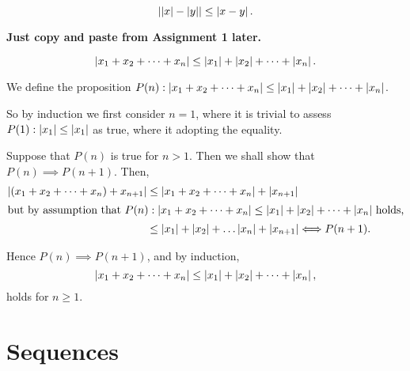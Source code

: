 \documentclass[12pt]{article}
\theoremstyle{definition}
\renewenvironment{proof}[1][\proofname]{\vspace{-10pt}\begin{replacementproof}}{\end{replacementproof}}
\begin{document}
    \begin{prop}
        \begin{equation*}
            \left|\left|x\right| - \left|y\right|\right| \leq \left|x - y\right|.
        \end{equation*}
    \end{prop}
    \begin{proof}
        \textbf{Just copy and paste from Assignment 1 later.}
    \end{proof} 

    \begin{corollary}
        \begin{equation*}
            \left|x_{1} + x_{2} + \dots + x_{n}\right| \leq \left|x_{1}\right| + \left|x_{2}\right| + \dots + \left|x_{n}\right|. 
        \end{equation*}
    \end{corollary}
    \begin{proof}
        We define the proposition $P(n): \left|x_{1} + x_{2} + \dots + x_{n}\right| \leq \left|x_{1}\right| + \left|x_{2}\right| + \dots + \left|x_{n}\right|$. 
        
        So by induction we first consider $n = 1$, where it is trivial to assess $P(1): \left|x_{1}\right| \leq \left|x_{1}\right|$ as true, where it adopting the equality. 

        Suppose that $P(n)$ is true for $n > 1$. Then we shall show that $P(n) \implies P(n + 1)$. 
        Then,
        \begin{align*}
            \left|(x_{1} + x_{2} + \dots + x_{n}) + x_{n + 1}\right| &\leq \left|x_{1} + x_{2} + \dots + x_{n}\right| + \left|x_{n + 1}\right| \\
            \intertext{but by assumption that $P(n): \left|x_{1} + x_{2} + \dots + x_{n}\right| \leq \left|x_{1}\right| + \left|x_{2}\right| + \dots + \left|x_{n}\right|$ holds,}
                                                              &\leq \left|x_{1}\right| + \left|x_{2}\right| + \dots \left|x_{n}\right| + \left|x_{n + 1}\right| \Longleftrightarrow P(n + 1).
        \end{align*}

        Hence $P(n) \implies P(n + 1)$, and by induction,
        \begin{equation*}
            \left|x_{1} + x_{2} + \dots + x_{n}\right| \leq \left|x_{1}\right| + \left|x_{2}\right| + \dots + \left|x_{n}\right|,
        \end{equation*}
        holds for $n \geq 1$.
    \end{proof}
\newpage
\section{Sequences}
\end{document}

